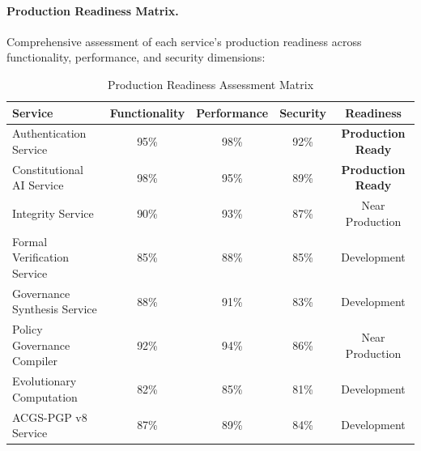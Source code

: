 \documentclass[manuscript,screen,9pt]{acmart}
\newcommand{\tablesize}{\footnotesize}
\newcommand{\tableheader}[1]{\textbf{#1}}
\begin{document}
\paragraph{Production Readiness Matrix.}
Comprehensive assessment of each service's production readiness across functionality, performance, and security dimensions:

\begin{table}[!htb]
	\centering
	\caption{Production Readiness Assessment Matrix}
	\label{tab:production_readiness}
	\tablesize
	\begin{tabular}{@{}lcccc@{}}
		\toprule
		\tableheader{Service}        & \tableheader{Functionality} & \tableheader{Performance} & \tableheader{Security} & \tableheader{Readiness}   \\
		\midrule
		Authentication Service       & 95\%                        & 98\%                      & 92\%                   & \textbf{Production Ready} \\
		Constitutional AI Service    & 98\%                        & 95\%                      & 89\%                   & \textbf{Production Ready} \\
		Integrity Service            & 90\%                        & 93\%                      & 87\%                   & Near Production           \\
		Formal Verification Service  & 85\%                        & 88\%                      & 85\%                   & Development               \\
		Governance Synthesis Service & 88\%                        & 91\%                      & 83\%                   & Development               \\
		Policy Governance Compiler   & 92\%                        & 94\%                      & 86\%                   & Near Production           \\
		Evolutionary Computation     & 82\%                        & 85\%                      & 81\%                   & Development               \\
		ACGS-PGP v8 Service          & 87\%                        & 89\%                      & 84\%                   & Development               \\
		\bottomrule
	\end{tabular}
\end{table}
\end{document}
